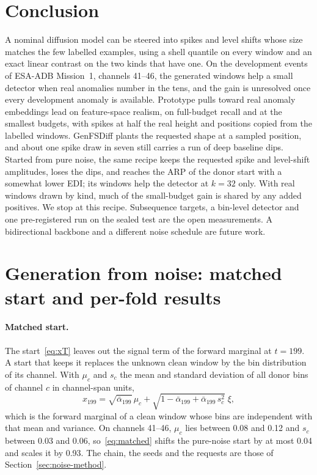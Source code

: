 \documentclass[11pt,a4paper]{article}
\newcommand{\abar}{\bar\alpha}
\begin{document}
\section{Conclusion}
\label{sec:conclusion}

A nominal diffusion model can be steered into spikes and level shifts whose
size matches the few labelled examples, using a shell quantile on every window
and an exact linear contrast on the two kinds that have one. On the
development events of ESA-ADB Mission~1, channels 41--46, the generated
windows help a small detector when real anomalies number in the tens, and the
gain is unresolved once every development anomaly is available. Prototype
pulls toward real anomaly embeddings lead on feature-space realism, on
full-budget recall and at the smallest budgets, with spikes at half the real
height and positions copied from the labelled windows. GenFSDiff plants the
requested shape at a sampled position, and about one spike draw in seven still
carries a run of deep baseline dips. Started from pure noise, the same recipe
keeps the requested spike and level-shift amplitudes, loses the dips, and
reaches the ARP of the donor start with a somewhat lower EDI; its windows help
the detector at $k = 32$ only. With real windows drawn by kind, much of the
small-budget gain is shared by any added positives. We stop at this recipe.
Subsequence targets, a bin-level detector and one pre-registered run on the
sealed test are the open measurements. A bidirectional backbone and a
different noise schedule are future work.




\clearpage
\appendix

\section{Generation from noise: matched start and per-fold results}
\label{app:noise}

\paragraph{Matched start.}
The start~\eqref{eq:xT} leaves out the signal term of the forward marginal at
$t = 199$. A start that keeps it replaces the unknown clean window by the bin
distribution of its channel. With $\mu_{c}$ and $s_{c}$ the mean and standard
deviation of all donor bins of channel $c$ in channel-span units,
\begin{equation}
\label{eq:matched}
x_{199}
  = \sqrt{\abar_{199}}\,\mu_{c}
  + \sqrt{1 - \abar_{199} + \abar_{199}\,s_{c}^{2}}\;\xi,
\end{equation}
which is the forward marginal of a clean window whose bins are independent
with that mean and variance. On channels 41--46, $\mu_{c}$ lies between 0.08
and 0.12 and $s_{c}$ between 0.03 and 0.06, so~\eqref{eq:matched} shifts the
pure-noise start by at most 0.04 and scales it by 0.93. The chain, the seeds
and the requests are those of Section~\ref{sec:noise-method}.
\end{document}
